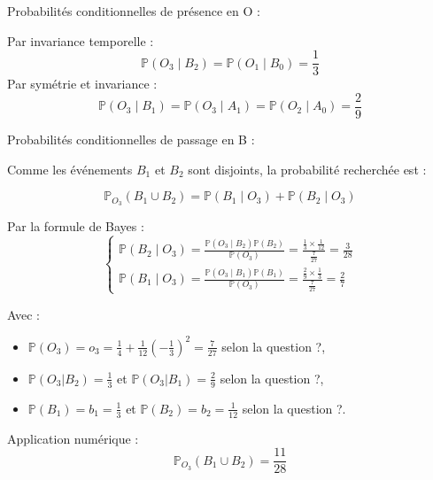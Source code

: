 \documentclass[10pt,a4paper]{article}
\begin{document}
\q Probabilités conditionnelles de présence en O :

Par invariance temporelle :
\[
\mathbb{P}(O_3 \mid B_2) = \mathbb{P}(O_1 \mid B_0) = \frac{1}{3}
\]
Par symétrie et invariance :
\[
\mathbb{P}(O_3 \mid B_1) = \mathbb{P}(O_3 \mid A_1) = \mathbb{P}(O_2 \mid A_0) = \frac{2}{9}
\]

\q Probabilités conditionnelles de passage en B :

Comme les événements $B_1$ et $B_2$ sont disjoints, la probabilité recherchée est :

\[
\mathbb{P}_{O_3}(B_1 \cup B_2) = \mathbb{P}(B_1 \mid O_3) + \mathbb{P}(B_2 \mid O_3)
\]

Par la formule de Bayes :
\[
\begin{cases}
\mathbb{P}(B_2 \mid O_3) = \frac{\mathbb{P}(O_3 \mid B_2) \mathbb{P}(B_2)}{\mathbb{P}(O_3)} = \frac{\frac{1}{3} \times \frac{1}{12}}{\frac{7}{27}} = \frac{3}{28} \\
\mathbb{P}(B_1 \mid O_3) = \frac{\mathbb{P}(O_3 \mid B_1) \mathbb{P}(B_1)}{\mathbb{P}(O_3)} = \frac{\frac{2}{9} \times \frac{1}{3}}{\frac{7}{27}} = \frac{2}{7}
\end{cases}
\]

Avec :
\begin{itemize}
    \item $\mathbb{P}(O_3) = o_3 = \frac{1}{4} + \frac{1}{12}(-\frac{1}{3})^{2} = \frac{7}{27}$ selon la question ?,
    \item $\mathbb{P}(O_3|B_2) = \frac{1}{3}$ et $\mathbb{P}(O_3|B_1) = \frac{2}{9}$ selon la question ?,
    \item $\mathbb{P}(B_1) = b_1 = \frac{1}{3}$ et $\mathbb{P}(B_2) = b_2 = \frac{1}{12}$ selon la
    question ?. \\
\end{itemize}

Application numérique :
\[
\mathbb{P}_{O_3}(B_1 \cup B_2) = \frac{11}{28}
\]
\end{document}
